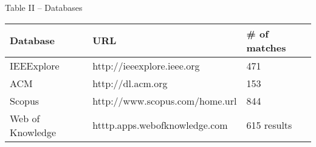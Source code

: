 \centering
Table II – Databases

\begin{tabular}{p{8em} p{15em} p{10em}}
    \bfseries{Database} & \bfseries{URL} & \bfseries{\# of matches} \\
    \hline
    IEEExplore & http://ieeexplore.ieee.org & 471 \\
    ACM & http://dl.acm.org & 153 \\
    Scopus & http://www.scopus.com/home.url & 844 \\
    Web of Knowledge & htttp.apps.webofknowledge.com &  615 results \\
    \hline
\end{tabular}

\raggedright
